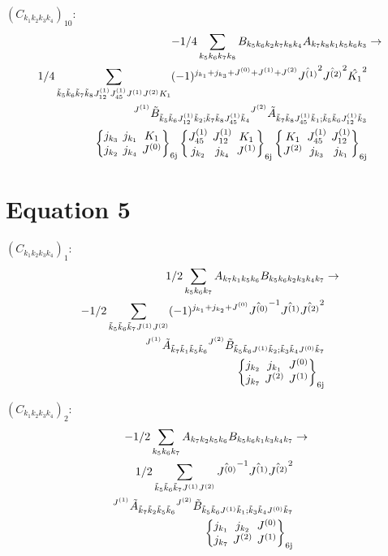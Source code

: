 \documentclass[11pt]{article}
\newcommand{\sixj}[6]{\begingroup\setlength{\arraycolsep}{0.2em}\begin{Bmatrix} #1 & #2 & #3 \\ #4 & #5 & #6 \end{Bmatrix}_{\text{6j}}\endgroup}
\begin{document}
$\left({C}_{{k}_{1}{k}_{2}{k}_{3}{k}_{4}}\right)_{10}$:
\begin{align}
-1/4\sum_{{k}_{5}{k}_{6}{k}_{7}{k}_{8}}{B}_{{k}_{5}{k}_{6}{k}_{2}{k}_{7}{k}_{8}{k}_{4}}{A}_{{k}_{7}{k}_{8}{k}_{1}{k}_{5}{k}_{6}{k}_{3}}&\rightarrow \notag \\1/4\sum_{\tilde{k}_{5}\tilde{k}_{6}\tilde{k}_{7}\tilde{k}_{8}J^{(1)}_{12}J^{(1)}_{45}J^{(1)}J^{(2)}K_{1}}(-1)^{j_{{k}_{1}} +j_{{k}_{3}} +J^{(0)} +J^{(1)} +J^{(2)} }\hat{J^{(1)}}^{2}\hat{J^{(2)}}^{2}\hat{K_{1}}^{2}& \notag \\{}^{J^{(1)}}\tilde{B}_{\tilde{k}_{5}\tilde{k}_{6}J^{(1)}_{12}\tilde{k}_{2};\tilde{k}_{7}\tilde{k}_{8}J^{(1)}_{45}\tilde{k}_{4}}{}^{J^{(2)}}\tilde{A}_{\tilde{k}_{7}\tilde{k}_{8}J^{(1)}_{45}\tilde{k}_{1};\tilde{k}_{5}\tilde{k}_{6}J^{(1)}_{12}\tilde{k}_{3}}& \notag \\\sixj{j_{{k}_{3}}}{j_{{k}_{1}}}{K_{1}}{j_{{k}_{2}}}{j_{{k}_{4}}}{J^{(0)}}\sixj{J^{(1)}_{45}}{J^{(1)}_{12}}{K_{1}}{j_{{k}_{2}}}{j_{{k}_{4}}}{J^{(1)}}\sixj{K_{1}}{J^{(1)}_{45}}{J^{(1)}_{12}}{J^{(2)}}{j_{{k}_{3}}}{j_{{k}_{1}}}
\end{align}

\section{Equation 5}
$\left({C}_{{k}_{1}{k}_{2}{k}_{3}{k}_{4}}\right)_{1}$:
\begin{align}
1/2\sum_{{k}_{5}{k}_{6}{k}_{7}}{A}_{{k}_{7}{k}_{1}{k}_{5}{k}_{6}}{B}_{{k}_{5}{k}_{6}{k}_{2}{k}_{3}{k}_{4}{k}_{7}}&\rightarrow \notag \\-1/2\sum_{\tilde{k}_{5}\tilde{k}_{6}\tilde{k}_{7}J^{(1)}J^{(2)}}(-1)^{j_{{k}_{1}} +j_{{k}_{2}} +J^{(0)} }\hat{J^{(0)}}^{-1}\hat{J^{(1)}}\hat{J^{(2)}}^{2}& \notag \\{}^{J^{(1)}}\tilde{A}_{\tilde{k}_{7}\tilde{k}_{1}\tilde{k}_{5}\tilde{k}_{6}}{}^{J^{(2)}}\tilde{B}_{\tilde{k}_{5}\tilde{k}_{6}J^{(1)}\tilde{k}_{2};\tilde{k}_{3}\tilde{k}_{4}J^{(0)}\tilde{k}_{7}}& \notag \\\sixj{j_{{k}_{2}}}{j_{{k}_{1}}}{J^{(0)}}{j_{{k}_{7}}}{J^{(2)}}{J^{(1)}}
\end{align}

$\left({C}_{{k}_{1}{k}_{2}{k}_{3}{k}_{4}}\right)_{2}$:
\begin{align}
-1/2\sum_{{k}_{5}{k}_{6}{k}_{7}}{A}_{{k}_{7}{k}_{2}{k}_{5}{k}_{6}}{B}_{{k}_{5}{k}_{6}{k}_{1}{k}_{3}{k}_{4}{k}_{7}}&\rightarrow \notag \\1/2\sum_{\tilde{k}_{5}\tilde{k}_{6}\tilde{k}_{7}J^{(1)}J^{(2)}}\hat{J^{(0)}}^{-1}\hat{J^{(1)}}\hat{J^{(2)}}^{2}& \notag \\{}^{J^{(1)}}\tilde{A}_{\tilde{k}_{7}\tilde{k}_{2}\tilde{k}_{5}\tilde{k}_{6}}{}^{J^{(2)}}\tilde{B}_{\tilde{k}_{5}\tilde{k}_{6}J^{(1)}\tilde{k}_{1};\tilde{k}_{3}\tilde{k}_{4}J^{(0)}\tilde{k}_{7}}& \notag \\\sixj{j_{{k}_{1}}}{j_{{k}_{2}}}{J^{(0)}}{j_{{k}_{7}}}{J^{(2)}}{J^{(1)}}
\end{align}
\end{document}
